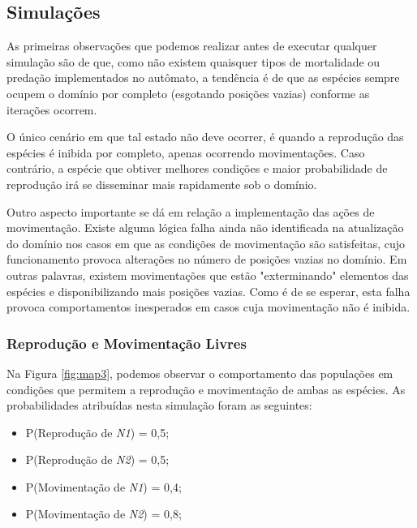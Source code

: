 \documentclass[a4paper, 12pt]{article}
\begin{document}
\subsection*{Simulações}

As primeiras observações que podemos realizar antes de executar qualquer simulação são de que, como não existem quaisquer tipos de mortalidade ou predação implementados no autômato, a tendência é de que as espécies sempre ocupem o domínio por completo (esgotando posições vazias) conforme as iterações ocorrem.

O único cenário em que tal estado não deve ocorrer, é quando a reprodução das espécies é inibida por completo, apenas ocorrendo movimentações. Caso contrário, a espécie que obtiver melhores condições e maior probabilidade de reprodução irá se disseminar mais rapidamente sob o domínio.

Outro aspecto importante se dá em relação a implementação das ações de movimentação. Existe alguma lógica falha ainda não identificada na atualização do domínio nos casos em que as condições de movimentação são satisfeitas, cujo funcionamento provoca alterações no número de posições vazias no domínio. Em outras palavras, existem movimentações que estão "exterminando" \hspace{0.1cm}elementos das espécies e disponibilizando mais posições vazias. Como é de se esperar, esta falha provoca comportamentos inesperados em casos cuja movimentação não é inibida.

\subsubsection*{Reprodução e Movimentação Livres}

Na Figura \ref{fig:map3}, podemos observar o comportamento das populações em condições que permitem a reprodução e movimentação de ambas as espécies. As probabilidades atribuídas nesta simulação foram as seguintes:

\begin{itemize}
    \item P(Reprodução de \emph{N1}) = 0,5;
    \item P(Reprodução de \emph{N2}) = 0,5;
    \item P(Movimentação de \emph{N1}) = 0,4;
    \item P(Movimentação de \emph{N2}) = 0,8;
\end{itemize}
\end{document}
